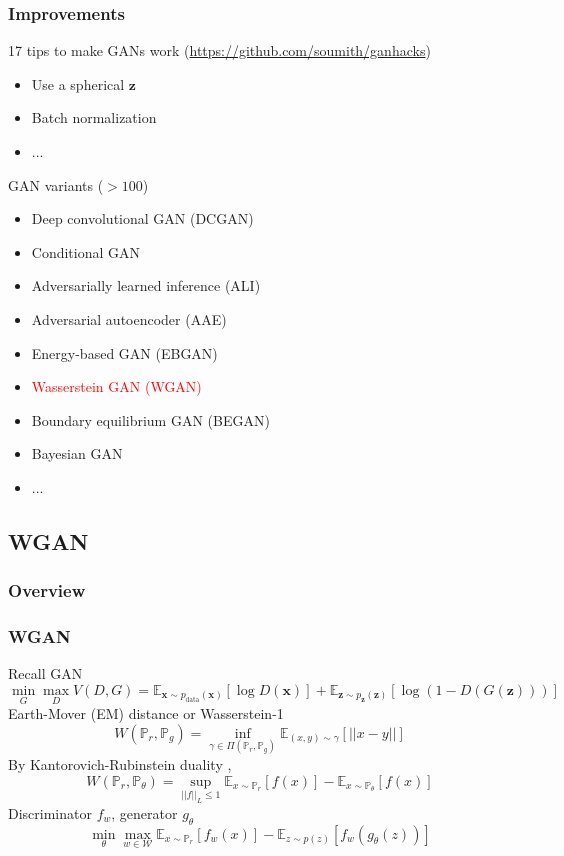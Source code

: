 \documentclass{beamer}
\begin{document}
\begin{frame}
\frametitle{Improvements}
17 tips to make GANs work (\url{https://github.com/soumith/ganhacks})
\begin{itemize}
\item Use a spherical $\mathbf{z}$
\item Batch normalization \cite{Ioffe2015}
\item ...
\end{itemize}
GAN variants ($>100$)
\begin{itemize}
  \item Deep convolutional GAN (DCGAN) \cite{Radford2015}
  \item Conditional GAN \cite{Mirza2014}
  \item Adversarially learned inference (ALI) \cite{Dumoulin2016}
  \item Adversarial autoencoder (AAE) \cite{Makhzani2015}
  \item Energy-based GAN (EBGAN) \cite{Zhao2016}
  \item \textcolor{red}{Wasserstein GAN (WGAN)} \cite{Arjovsky2017b}
  \item Boundary equilibrium GAN (BEGAN) \cite{Berthelot2017}
  \item Bayesian GAN \cite{Saatchi2017}
  \item ...
\end{itemize}
\end{frame}

\subsection{WGAN}

\begin{frame}
\frametitle{Overview}
\end{frame}

\begin{frame}
\frametitle{WGAN}
Recall GAN
$$\min_G \max_D V(D, G) = \mathbb{E}_{\mathbf{x} \sim p_{\text{data}}(\mathbf{x})}[\log D(\mathbf{x})] + \mathbb{E}_{\mathbf{z} \sim p_{\mathbf{z}}(\mathbf{z})}[\log (1-D(G(\mathbf{z})))]$$
Earth-Mover (EM) distance or Wasserstein-1 \cite{Monge1781}
$$W(\mathbb{P}_r, \mathbb{P}_g) = \inf_{\gamma \in \Pi(\mathbb{P}_r, \mathbb{P}_g)} \mathbb{E}_{(x,y) \sim \gamma}[||x-y||]$$
By Kantorovich-Rubinstein duality \cite{Villani2008},
$$W(\mathbb{P}_r, \mathbb{P}_{\theta}) = \sup_{||f||_L\leq 1} \mathbb{E}_{x \sim \mathbb{P}_r}[f(x)] - \mathbb{E}_{x \sim \mathbb{P}_{\theta}}[f(x)]$$
Discriminator $f_w$, generator $g_{\theta}$
$$\min_{\theta}\max_{w \in \mathcal{W}} \mathbb{E}_{x \sim \mathbb{P}_r}[f_w(x)] - \mathbb{E}_{z \sim p(z)}[f_w(g_{\theta}(z))]$$
\end{frame}
\end{document}
